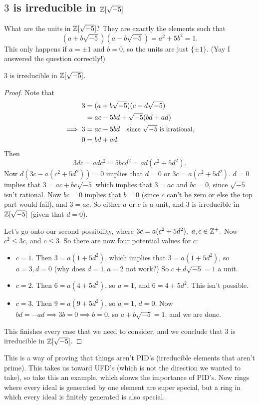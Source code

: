 \subsection{$3$ is irreducible in $\mathbb{Z}[\sqrt{-5} ]$}
What are the units in $\mathbb{Z}[\sqrt{-5} ]?$ They are exactly the elements such that \[
    (a+b\sqrt{-5} )(a-b\sqrt{-5} )=a^2+5b^2=1.
\] This only happens if $a=\pm 1$ and $b=0$, so the units are just $\{\pm 1\} $. (Yay I answered the question correctly!)
\begin{claim}
    $3$ is irreducible in $\mathbb{Z}[\sqrt{-5} ]$.
\end{claim}
\begin{proof}
    Note that 
    \begin{align*}
        3 &=(a+b\sqrt{-5} )(c+d\sqrt{-5} )\\
          &= ac-5bd+\sqrt{-5} (bd+ad) \\
        \implies 3&=ac-5bd\quad \small{\text{since} \ \sqrt{-5} \ \text{is irrational}},\\
        0&=bd+ad.
    \end{align*}
    Then \[
        3dc=adc^2=5bcd^2=ad(c^2+5d^2).
    \] Now $d\left( 3c-a\left( c^2+5d^2 \right)  \right) =0$ implies that $d=0$ or $3c=a(c^2+5d^2)$. $d=0$ implies that $3=ac+bc\sqrt{-5} $ which implies that $3=ac$ and $bc=0$, since $\sqrt{-5} $ isn't rational. Now $bc=0$ implies that $b=0$ (since $c$ can't be zero or else the top part would fail), and $3=ac$. So either $a$ or $c$ is a unit, and $3$ is irreducible in $\mathbb{Z}[\sqrt{-5} ]$ (given that $d=0$).

    Let's go onto our second possibility, where  $
        3c=a(c^2+5d^2), \ a,c\in \mathbb{Z}^+.
$ Now $c^2\leq 3c$, and $c\leq 3$. So there are now four potential values for $c$: 
\begin{itemize}
    \item $c=1$. Then $3=a(1+5d^2)$, which implies that $3=a(1+5d^2)$, so $a=3,d=0$ (why does $d=1,a=2$ not work?) So $c+d\sqrt{-5} =1$ a unit.
    \item $c=2$. Then $6=a(4+5d^2)$, so $a=1$, and $6=4+5d^2$. This isn't possible.
    \item $c=3$. Then $9=a(9+5d^2)$, so $a=1$, $d=0$. Now $bd=-ad\implies 3b=0\implies b=0$, so $a+b\sqrt{-5} =1$, and we are done.
\end{itemize}
This finishes every case that we need to consider, and we conclude that $3$ is irreducible in $\mathbb{Z}[\sqrt{-5} ]$.
\end{proof}
This is a way of proving that things aren't PID's (irreducible elements that aren't prime). This takes us toward UFD's (which is not the direction we wanted to take), so take this an example, which shows the importance of PID's. Now rings where every ideal is generated by one element are super special, but a ring in which every ideal is finitely generated is also special.
